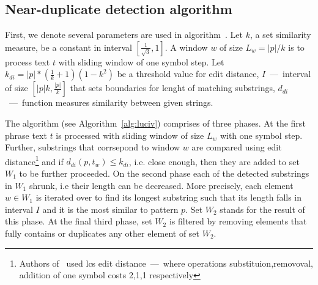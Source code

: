 
\subsection{Near-duplicate detection algorithm}
\label{sec:lucivalgo}
First, we denote several parameters are used in algorithm~\cite{.}.
Let $k$, a set similarity measure, be a constant in interval $[\frac{1}{\sqrt{3}},1]$.
A window $w$ of size $L_{w} = |p|/k$ is to process text $t$ with sliding window of one symbol step.
Let $k_{di} = |p|*(\frac{1}{k}+1)(1-k^2)$ be a threshold value for edit distance,
$I$~---~interval of size $[|p|k,\frac{|p|}{k}]$ that sets boundaries for lenght of matching substrings,
$d_{di}$~---~function measures similarity between given strings.

The algorithm (see Algorithm~\ref{alg:luciv}) comprises of three phases.
At the first phrase text $t$ is processed with sliding window of size $L_{w}$ with one symbol step.
Further, substrings that corrsepond to window $w$ are compared using edit distance\footnote{
  Authors of~\cite{.} used lcs edit distance~---~where  operations substituion,removoval, addition of one symbol costs 2,1,1 respectively}
and if $d_{di}(p,t_{w}) \leq k_{di}$, i.e. close enough, then they are added to set $W_{1}$ to be further proceeded. 
On the second phase each of the detected substrings in $W_{1}$ shrunk, i.e their length can be decreased.
More precisely, each element $w \in W_{1}$ is iterated over to find its longest substring such that its length falls in interval $I$ and it is the most similar to pattern $p$.
Set $W_2$ stands for the result of this phase.
At the final third phase, set $W_{2}$ is filtered by removing elements that fully contains or duplicates any other element of set $W_{2}$.

